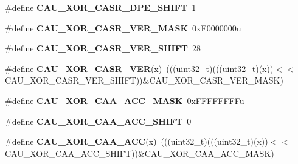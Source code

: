 \begin{DoxyCompactItemize}
\item 
\#define {\bfseries C\+A\+U\+\_\+\+X\+O\+R\+\_\+\+C\+A\+S\+R\+\_\+\+D\+P\+E\+\_\+\+S\+H\+I\+FT}~1\hypertarget{group__CAU__Register__Masks_ga2c2901b4531d55d9625468c78cea25b0}{}\label{group__CAU__Register__Masks_ga2c2901b4531d55d9625468c78cea25b0}

\item 
\#define {\bfseries C\+A\+U\+\_\+\+X\+O\+R\+\_\+\+C\+A\+S\+R\+\_\+\+V\+E\+R\+\_\+\+M\+A\+SK}~0x\+F0000000u\hypertarget{group__CAU__Register__Masks_ga1ac156673986e2dc85b9d9491a3d4bf2}{}\label{group__CAU__Register__Masks_ga1ac156673986e2dc85b9d9491a3d4bf2}

\item 
\#define {\bfseries C\+A\+U\+\_\+\+X\+O\+R\+\_\+\+C\+A\+S\+R\+\_\+\+V\+E\+R\+\_\+\+S\+H\+I\+FT}~28\hypertarget{group__CAU__Register__Masks_ga935619a005c89a213ef4df90046e2802}{}\label{group__CAU__Register__Masks_ga935619a005c89a213ef4df90046e2802}

\item 
\#define {\bfseries C\+A\+U\+\_\+\+X\+O\+R\+\_\+\+C\+A\+S\+R\+\_\+\+V\+ER}(x)~(((uint32\+\_\+t)(((uint32\+\_\+t)(x))$<$$<$C\+A\+U\+\_\+\+X\+O\+R\+\_\+\+C\+A\+S\+R\+\_\+\+V\+E\+R\+\_\+\+S\+H\+I\+FT))\&C\+A\+U\+\_\+\+X\+O\+R\+\_\+\+C\+A\+S\+R\+\_\+\+V\+E\+R\+\_\+\+M\+A\+SK)\hypertarget{group__CAU__Register__Masks_gad0d12a99e05798ea2c6cd22d02b0752a}{}\label{group__CAU__Register__Masks_gad0d12a99e05798ea2c6cd22d02b0752a}

\item 
\#define {\bfseries C\+A\+U\+\_\+\+X\+O\+R\+\_\+\+C\+A\+A\+\_\+\+A\+C\+C\+\_\+\+M\+A\+SK}~0x\+F\+F\+F\+F\+F\+F\+F\+Fu\hypertarget{group__CAU__Register__Masks_gad749b4e76ae58d704efbe7be8c9fd935}{}\label{group__CAU__Register__Masks_gad749b4e76ae58d704efbe7be8c9fd935}

\item 
\#define {\bfseries C\+A\+U\+\_\+\+X\+O\+R\+\_\+\+C\+A\+A\+\_\+\+A\+C\+C\+\_\+\+S\+H\+I\+FT}~0\hypertarget{group__CAU__Register__Masks_gabce35c8c48d54d7175820c3a5f0b120c}{}\label{group__CAU__Register__Masks_gabce35c8c48d54d7175820c3a5f0b120c}

\item 
\#define {\bfseries C\+A\+U\+\_\+\+X\+O\+R\+\_\+\+C\+A\+A\+\_\+\+A\+CC}(x)~(((uint32\+\_\+t)(((uint32\+\_\+t)(x))$<$$<$C\+A\+U\+\_\+\+X\+O\+R\+\_\+\+C\+A\+A\+\_\+\+A\+C\+C\+\_\+\+S\+H\+I\+FT))\&C\+A\+U\+\_\+\+X\+O\+R\+\_\+\+C\+A\+A\+\_\+\+A\+C\+C\+\_\+\+M\+A\+SK)\hypertarget{group__CAU__Register__Masks_gadef3a35dce2667f2a097ceed047bd414}{}\label{group__CAU__Register__Masks_gadef3a35dce2667f2a097ceed047bd414}


\end{DoxyCompactItemize}
